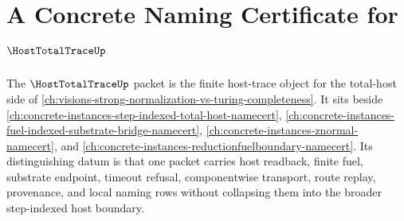 \chapter{A Concrete Naming Certificate for $\HostTotalTraceUp$}
\label{ch:concrete-instances-hosttotaltrace-namecert}

The $\HostTotalTraceUp$ packet is the finite host-trace object for the total-host side of \autoref{ch:visions-strong-normalization-vs-turing-completeness}. It sits beside \autoref{ch:concrete-instances-step-indexed-total-host-namecert}, \autoref{ch:concrete-instances-fuel-indexed-substrate-bridge-namecert}, \autoref{ch:concrete-instances-znormal-namecert}, and \autoref{ch:concrete-instances-reductionfuelboundary-namecert}. Its distinguishing datum is that one packet carries host readback, finite fuel, substrate endpoint, timeout refusal, componentwise transport, route replay, provenance, and local naming rows without collapsing them into the broader step-indexed host boundary.



